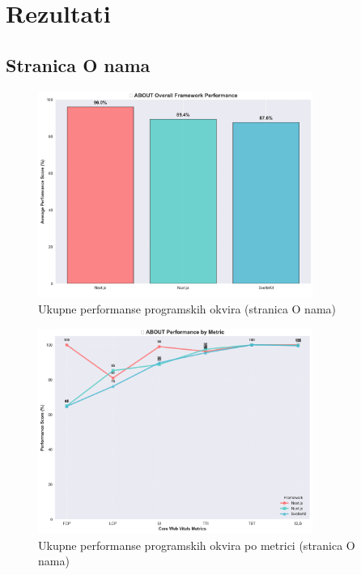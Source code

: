 \section{Rezultati}

\subsection{Stranica O nama}

\begin{figure}[H]
    \centering
    \includegraphics[width=0.8\textwidth]{slike/rezultati/about/about_framework_overall_performance.png}
    \caption{Ukupne performanse programskih okvira (stranica O nama)}
    \label{fig:testiranje-o-nama-ukupne-performanse}
\end{figure}

\begin{figure}[H]
    \centering
    \includegraphics[width=0.8\textwidth]{slike/rezultati/about/about_performance_by_metric.png}
    \caption{Ukupne performanse programskih okvira po metrici (stranica O nama)}
    \label{fig:testiranje-o-nama-performanse-po-metrici}
\end{figure}

